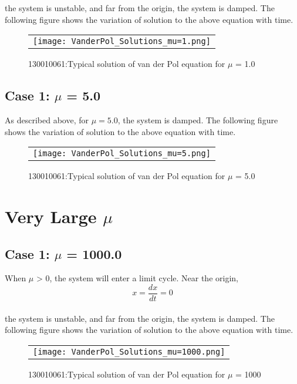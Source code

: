 \documentclass[12pt, a4paper]{report}
\begin{document}
the system is unstable, and far from the origin, the system is damped.
The following figure shows the variation of solution to the above equation with time.

\begin{figure}[H]
	\centering
	\begin{tabular} {l}
	\texttt{[image: VanderPol\_Solutions\_mu=1.png]} 
	\end{tabular}
	\caption{130010061:Typical solution of van der Pol equation for $\mu$ = 1.0}
\end{figure}
\label{fig3} 

\subsection{Case 1: $\mu$ = 5.0}
As described above, for $\mu=5.0$, the system is damped.
The following figure shows the variation of solution to the above equation with time.

\begin{figure}[H]
	\centering
	\begin{tabular} {l}
	\texttt{[image: VanderPol\_Solutions\_mu=5.png]} 
	\end{tabular}
	\caption{130010061:Typical solution of van der Pol equation for $\mu$ = 5.0}
\end{figure}
\label{fig4} 

\section{Very Large $\mu$}
\subsection{Case 1: $\mu$ = 1000.0}
When $\mu$ > 0, the system will enter a limit cycle. Near the origin, 
\begin{equation}
x = \frac{dx}{dt} = 0
\end{equation}\\

the system is unstable, and far from the origin, the system is damped.
The following figure shows the variation of solution to the above equation with time.

\begin{figure}[H]
	\centering
	\begin{tabular} {l}
	\texttt{[image: VanderPol\_Solutions\_mu=1000.png]} 
	\end{tabular}
	\caption{130010061:Typical solution of van der Pol equation for $\mu$ = 1000}
\end{figure}
\label{fig5} 
\end{document}
